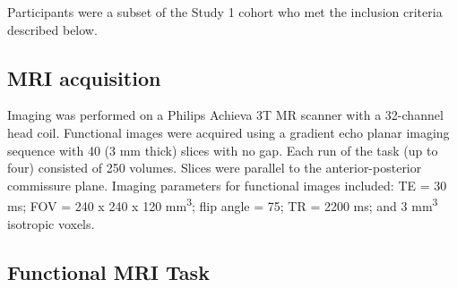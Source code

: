 Participants were a subset of the Study 1 cohort who met the inclusion criteria described below.  

\begin{table}
	\renewcommand{\tabcolsep}{0.09cm}
	\centering
	
	\caption[Participant demographics for Study 2.]{}
	\label{table:ch3-participants}
\end{table}

\subsection{MRI acquisition}

Imaging was performed on a Philips Achieva 3T MR scanner with a 32-channel head coil. Functional images were acquired using a gradient echo planar imaging sequence with 40 (3 mm thick) slices with no gap. Each run of the task (up to four) consisted of 250 volumes. Slices were parallel to the anterior-posterior commissure plane. Imaging parameters for functional images included: TE = 30 ms; FOV = 240 x 240 x 120 mm\textsuperscript{3}; flip angle = 75\degree; TR = 2200 ms; and 3 mm\textsuperscript{3} isotropic voxels.

\subsection{Functional MRI Task}



